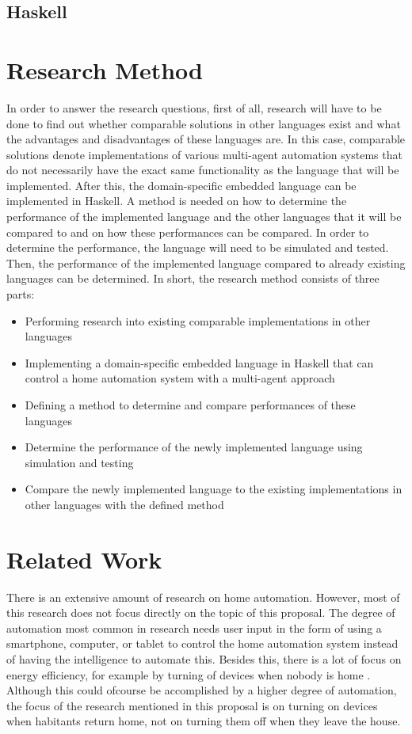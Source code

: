 \documentclass{sig-alternate-br}
\begin{document}
\subsection{Haskell}

\section{Research Method}
In order to answer the research questions, first of all, research will have to be done to find out whether comparable solutions in other languages exist and what the advantages and disadvantages of these languages are. In this case, comparable solutions denote implementations of various multi-agent automation systems that do not necessarily have the exact same functionality as the language that will be implemented. After this, the domain-specific embedded language can be implemented in Haskell. A method is needed on how to determine the performance of the implemented language and the other languages that it will be compared to and on how these performances can be compared. In order to determine the performance, the language will need to be simulated and tested. Then, the performance of the implemented language compared to already existing languages can be determined. In short, the research method consists of three parts:
\begin{itemize}
\item Performing research into existing comparable implementations in other languages
\item Implementing a domain-specific embedded language in Haskell that can control a home automation system with a multi-agent approach
\item Defining a method to determine and compare performances of these languages
\item Determine the performance of the newly implemented language using simulation and testing
\item Compare the newly implemented language to the existing implementations in other languages with the defined method
\end{itemize}
\balancecolumns 
\section{Related Work}
There is an extensive amount of research on home automation. However, most of this research does not focus directly on the topic of this proposal.  The degree of automation most common in research needs user input in the form of using a smartphone, computer, or tablet to control the home automation system instead of having the intelligence to automate this. Besides this, there is a lot of focus on energy efficiency, for example by turning of devices when nobody is home \cite{sha}. Although this could ofcourse be accomplished by a higher degree of automation, the focus of the research mentioned in this proposal is on turning on devices when habitants return home, not on turning them off when they leave the house. \cite{ssm}
\end{document}

